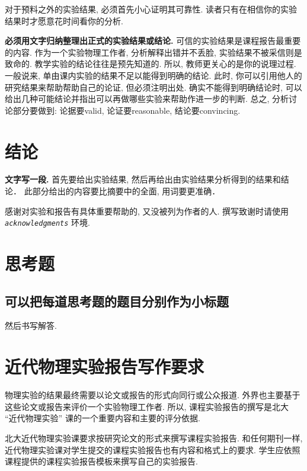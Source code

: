 \documentclass[font=fandol]{mpltx}
\newcommand{\note}[1]{{\color{gray}#1}}
\newcommand*\env[1]{\textit{\texttt{#1}}}
\begin{document}
对于预料之外的实验结果, 必须首先小心证明其可靠性.
读者只有在相信你的实验结果时才愿意花时间看你的分析.

\textbf{必须用文字归纳整理出正式的实验结果或结论.}
可信的实验结果是课程报告最重要的内容.
作为一个实验物理工作者, 分析解释出错并不丢脸, 实验结果不被采信则是致命的.
教学实验的结论往往是预先知道的.
所以, 教师更关心的是你的说理过程.
一般说来, 单由课内实验的结果不足以能得到明确的结论.
此时, 你可以引用他人的研究结果来帮助帮助自己的论证, 但必须注明出处.
确实不能得到明确结论时, 可以给出几种可能结论并指出可以再做哪些实验来帮助作进一步的判断.
总之, 分析讨论部分要做到: 论据要valid, 论证要reasonable, 结论要convincing.

\section{结论}
\textbf{文字写一段.}
首先要给出实验结果, 然后再给出由实验结果分析得到的结果和结论．
此部分给出的内容要比摘要中的全面, 用词要更准确．

\begin{acknowledgments}
	感谢对实验和报告有具体重要帮助的, 又没被列为作者的人.
	\note{撰写致谢时请使用 \env{acknowledgments} 环境.}
\end{acknowledgments}



\clearpage %
\appendix %
\section{思考题}\label{app:exercise}
\subsection{可以把每道思考题的题目分别作为小标题}
然后书写解答.

\section{近代物理实验报告写作要求}

物理实验的结果最终需要以论文或报告的形式向同行或公众报道.
外界也主要基于这些论文或报告来评价一个实验物理工作者.
所以, 课程实验报告的撰写是北大 ``近代物理实验'' 课的一个重要内容和主要的评分依据.

北大近代物理实验课要求按研究论文的形式来撰写课程实验报告.
和任何期刊一样, 近代物理实验课对学生提交的课程实验报告也有内容和格式上的要求.
学生应依照课程提供的课程实验报告模板来撰写自己的实验报告.
\end{document}
